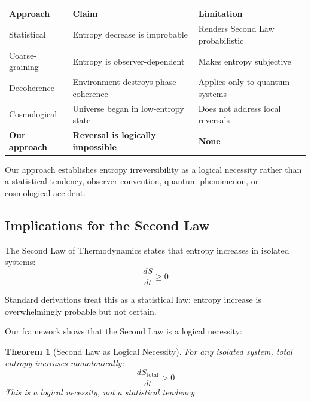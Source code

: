 \documentclass[twocolumn,10pt]{article}
\newtheorem{theorem}{Theorem}[section]
\theoremstyle{definition}
\theoremstyle{remark}
\begin{document}
\begin{table}[h]
\centering
\begin{tabular}{p{3.5cm}|p{5cm}|p{5cm}}
\textbf{Approach} & \textbf{Claim} & \textbf{Limitation} \\
\hline
Statistical & Entropy decrease is improbable & Renders Second Law probabilistic \\
\hline
Coarse-graining & Entropy is observer-dependent & Makes entropy subjective \\
\hline
Decoherence & Environment destroys phase coherence & Applies only to quantum systems \\
\hline
Cosmological & Universe began in low-entropy state & Does not address local reversals \\
\hline
\textbf{Our approach} & \textbf{Reversal is logically impossible} & \textbf{None} \\
\end{tabular}
\end{table}

Our approach establishes entropy irreversibility as a logical necessity rather than a statistical tendency, observer convention, quantum phenomenon, or cosmological accident.

\subsection{Implications for the Second Law}

The Second Law of Thermodynamics states that entropy increases in isolated systems:
$$
\frac{dS}{dt} \geq 0
$$

Standard derivations treat this as a statistical law: entropy increase is overwhelmingly probable but not certain.

Our framework shows that the Second Law is a logical necessity:

\begin{theorem}[Second Law as Logical Necessity]
For any isolated system, total entropy increases monotonically:
$$
\frac{dS_{\text{total}}}{dt} > 0
$$
This is a logical necessity, not a statistical tendency.
\end{theorem}
\end{document}
